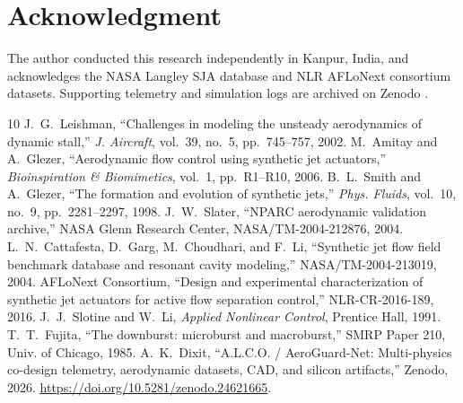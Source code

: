 \documentclass[journal,10pt,twocolumn]{IEEEtran}
\begin{document}
\section*{Acknowledgment}
The author conducted this research independently in Kanpur, India, and acknowledges the NASA Langley SJA database and NLR AFLoNext consortium datasets. Supporting telemetry and simulation logs are archived on Zenodo \cite{dixit2026zenodo}.

\begin{thebibliography}{10}
 J.~G.~Leishman, ``Challenges in modeling the unsteady aerodynamics of dynamic stall,'' \emph{J. Aircraft}, vol.~39, no.~5, pp.~745--757, 2002.
 M.~Amitay and A.~Glezer, ``Aerodynamic flow control using synthetic jet actuators,'' \emph{Bioinspiration \& Biomimetics}, vol.~1, pp.~R1--R10, 2006.
 B.~L.~Smith and A.~Glezer, ``The formation and evolution of synthetic jets,'' \emph{Phys. Fluids}, vol.~10, no.~9, pp.~2281--2297, 1998.
 J.~W.~Slater, ``NPARC aerodynamic validation archive,'' NASA Glenn Research Center, NASA/TM-2004-212876, 2004.
 L.~N.~Cattafesta, D.~Garg, M.~Choudhari, and F.~Li, ``Synthetic jet flow field benchmark database and resonant cavity modeling,'' NASA/TM-2004-213019, 2004.
 AFLoNext Consortium, ``Design and experimental characterization of synthetic jet actuators for active flow separation control,'' NLR-CR-2016-189, 2016.
 J.~J.~Slotine and W.~Li, \emph{Applied Nonlinear Control}, Prentice Hall, 1991.
 T.~T.~Fujita, ``The downburst: microburst and macroburst,'' SMRP Paper 210, Univ. of Chicago, 1985.
 A.~K.~Dixit, ``A.L.C.O. / AeroGuard-Net: Multi-physics co-design telemetry, aerodynamic datasets, CAD, and silicon artifacts,'' Zenodo, 2026. \url{https://doi.org/10.5281/zenodo.24621665}.
\end{thebibliography}
\end{document}

